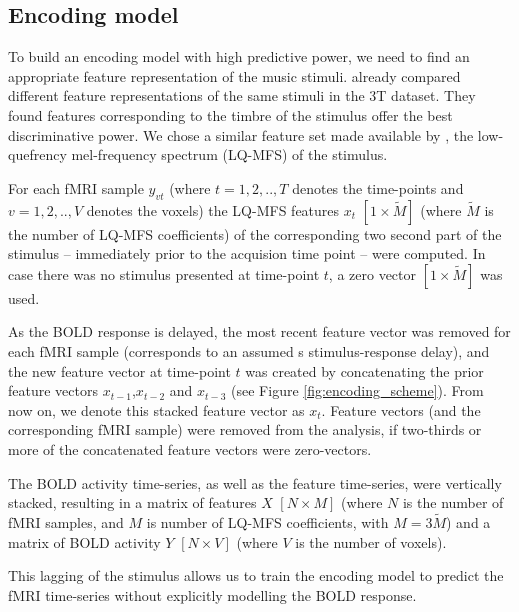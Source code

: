 \subsection*{Encoding model}

To build an encoding model with high predictive power, we need to find an
appropriate feature representation of the music stimuli.  \citet{CTK+2012}
already compared different feature representations of the same stimuli in the
3T dataset. They found features corresponding to the timbre of the
stimulus offer the best discriminative power. We chose a similar feature set made
available by \citet{HDH+2015}, the low-quefrency mel-frequency spectrum
(LQ-MFS) of the stimulus.

For each f{MRI} sample $y_{vt}$ (where $t=1,2,..,T$ denotes the time-points and
$v=1,2,..,V$ denotes the voxels) the LQ-MFS features $x_{t}$
$[1\times\widetilde{M}]$ (where $\widetilde{M}$ is the number of LQ-MFS
coefficients) of the corresponding two second part of the stimulus -- immediately
prior to the acquision time point -- were
computed. In case there was no stimulus presented at time-point $t$, a zero
vector $[1\times\widetilde{M}]$ was used. 

As the BOLD response is delayed,  the most recent feature vector was removed
for each f{MRI} sample (corresponds to an assumed \unit[2]{s} stimulus-response
delay), and the new feature vector at time-point $t$ was created by
concatenating the prior feature vectors $x_{t-1}$,$x_{t-2}$ and $x_{t-3}$ (see
Figure \ref{fig:encoding_scheme}). From now on, we denote this stacked feature
vector as $x_{t}$.  Feature vectors (and the corresponding f{MRI} sample) were
removed from the analysis, if two-thirds or more of the concatenated feature
vectors were zero-vectors.

The BOLD activity time-series, as well as the feature time-series, were
vertically stacked, resulting in a matrix of features $X$ $[N\times M]$ (where
$N$ is the number of f{MRI} samples, and $M$ is number of LQ-MFS coefficients,
with $M=3\widetilde{M}$) and a matrix of BOLD activity $Y$ $[N\times V]$ (where
$V$ is the number of voxels).

This lagging of the stimulus allows us to train the encoding model to predict
the f{MRI} time-series without explicitly modelling the BOLD response.

